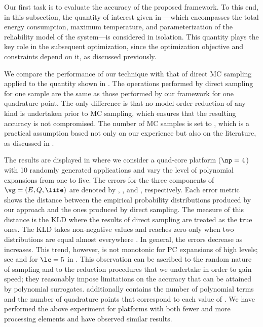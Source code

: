 Our first task is to evaluate the accuracy of the proposed framework. To this
end, in this subsection, the quantity of interest given in
---which encompasses the total energy
consumption, maximum temperature, and parameterization of the reliability model
of the system---is considered in isolation. This quantity plays the key role in
the subsequent optimization, since the optimization objective and constraints
depend on it, as discussed previously.

We compare the performance of our technique with that of direct \ac{MC} sampling
applied to the quantity shown in . The
operations performed by direct sampling for one sample are the same as those
performed by our framework for one quadrature point. The only difference is that
no model order reduction of any kind is undertaken prior to \ac{MC} sampling,
which ensures that the resulting accuracy is not compromised. The number of
\ac{MC} samples is set to , which is a practical assumption based
not only on our experience but also on the literature, as discussed in
.

The results are displayed in  where we
consider a quad-core platform ($\np = 4$) with 10 randomly generated
applications and vary the level of polynomial expansions \lc from one to five.
The errors for the three components of $\vg = (E, Q, \life)$ are denoted by
, , and \error{\life}, respectively. Each error metric shows
the distance between the empirical probability distributions produced by our
approach and the ones produced by direct sampling. The measure of this distance
is the \ac{KLD} \cite{gelman2013, hastie2013} where the results of direct
sampling are treated as the true ones. The \ac{KLD} takes non-negative values
and reaches zero only when two distributions are equal almost everywhere
\cite{durrett2010}. In general, the errors decrease as \lc increases. This
trend, however, is not monotonic for \ac{PC} expansions of high levels; see
 and \error{\life} for $\lc = 5$ in .
This observation can be ascribed to the random nature of sampling and to the
reduction procedures that we undertake in order to gain speed; they reasonably
impose limitations on the accuracy that can be attained by polynomial
surrogates.  additionally contains the number
of polynomial terms \nc and the number of quadrature points \nq that correspond
to each value of \lc. We have performed the above experiment for platforms with
both fewer and more processing elements and have observed similar results.

